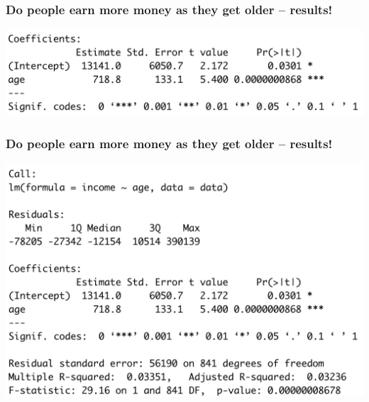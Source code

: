 \documentclass[aspectratio=169]{beamer}
\theoremstyle{principle}
\begin{document}
\begin{frame}
\frametitle{Do people earn more money as they get older -- results!}
\vspace{21.5mm}
\begin{center}
\includegraphics[scale=0.5]{income_v_age_regression_coef.png}
\end{center}

\end{frame}

\begin{frame}
\frametitle{Do people earn more money as they get older -- results!}

\begin{center}
\includegraphics[scale=0.5]{income_v_age_regression.png}
\end{center}

\end{frame}
\end{document}
